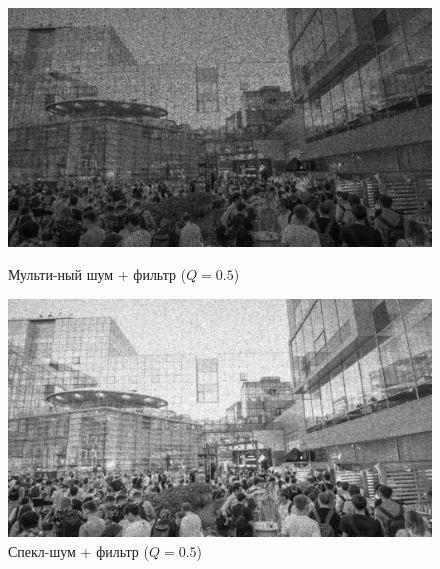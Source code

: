 \documentclass[a4paper]{article}
\begin{document}
\begin{figure}[H]
    \begin{minipage}{0.49\textwidth}
        \centering \includegraphics[width=\textwidth]{images/2_low_filters/multiplicative - contrharmonic (Q=0.5).jpg}
        \caption{Мульти-ный шум + фильтр ($Q = 0.5$)}
    \end{minipage}\hfill
    \begin{minipage}{0.49\textwidth}
        \centering \includegraphics[width=\textwidth]{images/2_low_filters/speckle - contrharmonic (Q=0.5).jpg}
        \caption{Спекл-шум + фильтр ($Q = 0.5$)}
    \end{minipage}
\end{figure}
\end{document}
